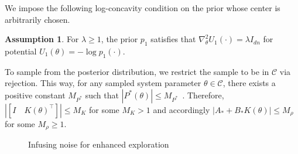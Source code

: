 \documentclass[11pt]{article}
\theoremstyle{plain}
\theoremstyle{definition}
\newtheorem{assumption}[thm]{Assumption}
\theoremstyle{remark}
\newcommand{\x}{\bm{x}}
\begin{document}
We impose the following log-concavity condition on the prior  whose center is arbitrarily chosen.
\begin{assumption}\label{ass:init_bound}
For $\lambda \geq 1$,  the prior $p_1$ satisfies that $\nabla^2_\theta U_1(\cdot) = \lambda I_{dn}$ for potential $U_1(\theta)=-\log p_1(\cdot)$.
\end{assumption}


To sample from the posterior distribution, we restrict the sample to be in $\mathcal{C}$ via rejection. This way, for any sampled system parameter $ \theta \in \mathcal{C}$, there exists a positive constant $M_{P^*}$ such that $| P^*(\theta) | \leq M_{P^*}$~\cite{abeille2017thompson}. 
Therefore, $|[I \quad K(\theta)^\top ]| \leq M_K$ for some $M_K>1$ and accordingly 
$|A_*+B_*K(\theta)|\leq M_\rho$ for some $M_\rho \geq 1$.


\begin{figure}[h]\label{alg:infusing}
    \centering
    \caption{Infusing noise for enhanced exploration}
    \label{fig:horizon}
\end{figure}
\end{document}
